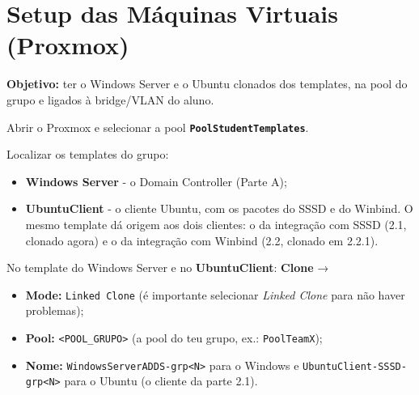 
\section*{Setup das Máquinas Virtuais (Proxmox)}


\textbf{Objetivo:} ter o Windows Server e o Ubuntu clonados dos templates, na pool do grupo e ligados à bridge/VLAN do aluno.


Abrir o Proxmox e selecionar a pool \textbf{\texttt{PoolStudentTemplates}}.


Localizar os templates do grupo:

\begin{itemize}
\item \textbf{Windows Server} - o Domain Controller (Parte A);
\item \textbf{UbuntuClient} - o cliente Ubuntu, com os pacotes do SSSD e do Winbind. O mesmo template dá origem aos dois clientes: o da integração com SSSD (2.1, clonado agora) e o da integração com Winbind (2.2, clonado em 2.2.1).
\end{itemize}


No template do Windows Server e no \textbf{UbuntuClient}: \textbf{Clone} →

\begin{itemize}
\item \textbf{Mode:} \texttt{Linked Clone} (é importante selecionar \emph{Linked Clone} para não haver problemas);
\item \textbf{Pool:} \texttt{\textless{}POOL\_GRUPO\textgreater{}} (a pool do teu grupo, ex.: \texttt{PoolTeamX});
\item \textbf{Nome:} \texttt{WindowsServerADDS-grp\textless{}N\textgreater{}} para o Windows e \texttt{UbuntuClient-SSSD-grp\textless{}N\textgreater{}} para o Ubuntu (o cliente da parte 2.1).
\end{itemize}


